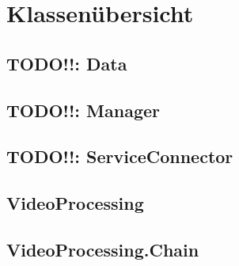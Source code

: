 \newpage
\section{Klassenübersicht}

\subsection{TODO!!: Data}

\newpage


\newpage


\newpage


\newpage


\newpage

\subsection{TODO!!: Manager}

\newpage


\newpage

\subsection{TODO!!: ServiceConnector}

\newpage

\subsection{VideoProcessing}

\newpage


\newpage


\newpage


\newpage

\subsection{VideoProcessing.Chain}


\newpage

